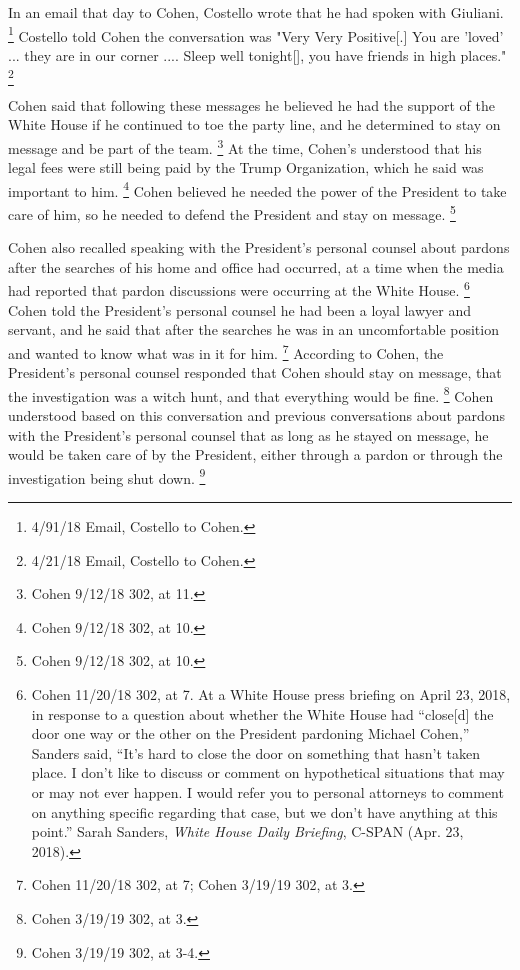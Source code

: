 In an email that day to Cohen, Costello wrote that he had spoken with Giuliani.%
\footnote{4/91/18 Email, Costello to Cohen.}
Costello told Cohen the conversation was "Very Very Positive[.] You are 'loved' ... they are in our corner .... Sleep well tonight[], you have friends in high places."%
\footnote{4/21/18 Email, Costello to Cohen. }

Cohen said that following these messages he believed he had the support of the White House if he continued to toe the party line, and he determined to stay on message and be part of the team.%
\footnote{Cohen 9/12/18 302, at 11.}
At the time, Cohen's understood that his legal fees were still being paid by the Trump Organization, which he said was important to him.%
\footnote{Cohen 9/12/18 302, at 10.}
Cohen believed he needed the power of the President to take care of him, so he needed to defend the President and stay on message.%
\footnote{Cohen 9/12/18 302, at 10.}

Cohen also recalled speaking with the President's personal counsel about pardons after the searches of his home and office had occurred, at a time when the media had reported that pardon discussions were occurring at the White House.%
\footnote{Cohen 11/20/18 302, at 7.
At a White House press briefing on April 23, 2018, in response to a question about whether the White House had “close[d] the door one way or the other on the President pardoning Michael Cohen,” Sanders said, “It’s hard to close the door on something that hasn’t taken place.
I don’t like to discuss or comment on hypothetical situations that may or may not ever happen.
I would refer you to personal attorneys to comment on anything specific regarding that case, but we don’t have anything at this point.”
Sarah Sanders, \textit{White House Daily Briefing}, C-SPAN (Apr. 23, 2018).}
Cohen told the President's personal counsel he had been a loyal lawyer and servant, and he said that after the searches he was in an uncomfortable position and wanted to know what was in it for him.%
\footnote{Cohen 11/20/18 302, at 7;
Cohen 3/19/19 302, at 3.}
According to Cohen, the President's personal counsel responded that Cohen should stay on message, that the investigation was a witch hunt, and that everything would be fine.%
\footnote{Cohen 3/19/19 302, at 3.}
Cohen understood based on this conversation and previous conversations about pardons with the President's personal counsel that as long as he stayed on message, he would be taken care of by the President, either through a pardon or through the investigation being shut down.%
\footnote{Cohen 3/19/19 302, at 3-4.}

